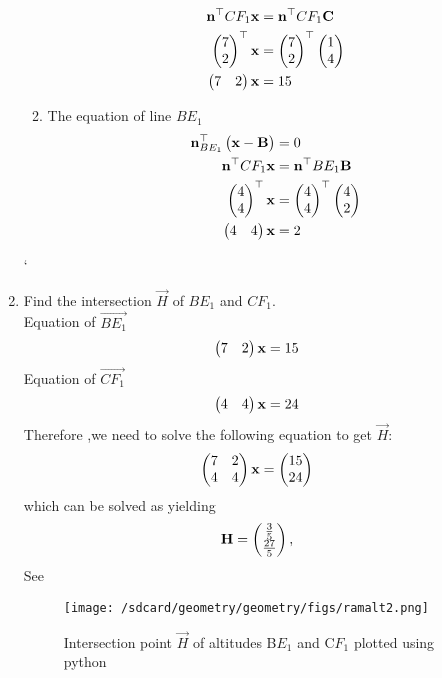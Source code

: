 \documentclass[11pt]{book}
\begin{document}
\begin{enumerate}[label=\thesection.\arabic*.,ref=\thesection.\theenumi]
\begin{enumerate}
\begin{align}
          \mathbf{n}^{\top}{CF_1}\mathbf{x}&= \mathbf{n}^{\top}{CF_1}\mathbf{C} \\
          \begin{pmatrix}7 \\2\end{pmatrix}^{\top}\mathbf{x}&=\begin{pmatrix}7 \\ 2\end{pmatrix}^{\top}\begin{pmatrix}1 \\ 4\end{pmatrix}\\
          \begin{pmatrix}7 & 2\end{pmatrix}\mathbf{x}&=15
      \end{align}
      \item The equation of line $BE_1$
      \begin{align}
          \mathbf{n}^{\top}_{BE_1}\begin{pmatrix}\mathbf{x}-\mathbf{B}\end{pmatrix}&=0 \\
          \mathbf{n}^{\top}{CF_1}\mathbf{x}&= \mathbf{n}^{\top}{BE_1}\mathbf{B} \\
          \begin{pmatrix}4\\4\end{pmatrix}^{\top}\mathbf{x}&=\begin{pmatrix}4 \\ 4\end{pmatrix}^{\top}\begin{pmatrix}4 \\ 2\end{pmatrix}\\
          \begin{pmatrix}4 & 4\end{pmatrix}\mathbf{x}&=2
      \end{align}
  \end{enumerate}
`
  

\item Find the intersection $\vec{H}$ of $BE_1$ and $CF_1$.
 \\  \solution Equation of $\vec{BE_1}$ \\
\begin{align}
    \begin{pmatrix}7 & 2\end{pmatrix}\mathbf{x}&= 15
\end{align}
Equation of $\vec{CF_1}$ \\
\begin{align}
    \begin{pmatrix}4 & 4\end{pmatrix}\mathbf{x}&=24
\end{align}
Therefore ,we need to solve the following equation to get $\vec{H}:$ \\
\begin{align}
        \begin{pmatrix}7&2\\4&4\end{pmatrix} \mathbf{x} &= \begin{pmatrix}15\\24\end{pmatrix}
\end{align}
%
which can be solved as 
%
yielding
%
\begin{align}
        \vec{H}&=\myvec{{\frac{3}{5}}\\ \frac{27}{5}}
		\label{eq:geo-alt-H},
\end{align}
%
See 
\begin{figure}[H]
\centering
\texttt{[image: /sdcard/geometry/geometry/figs/ramalt2.png]}
\caption{Intersection point $\vec{H}$ of altitudes B$E_{1}$ and C$F_{1}$ plotted using python}
\label{fig:m_tri_py}
\end{figure}


\end{enumerate}
\end{document}
